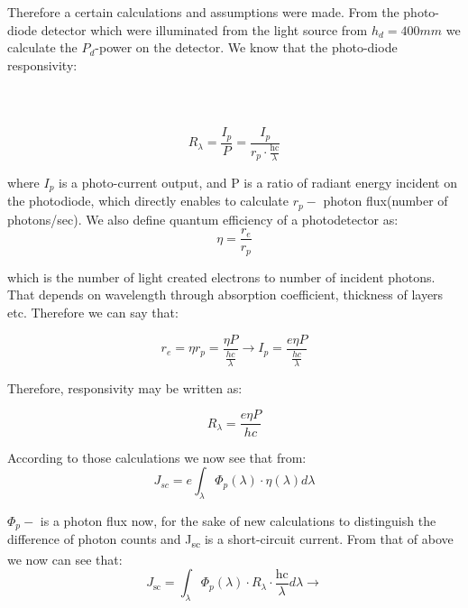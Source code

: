 Therefore a certain calculations and assumptions were made. From the
photo-diode detector which were illuminated from the light source from
\(h_{d} = 400mm\) we calculate the \(P_{d}\)-power on the detector. We know that the photo-diode responsivity: \\ \\ \\ \\ 

\begin{equation}
R_{\lambda} = \frac{I_{p}}{P} = \frac{I_{p}}{r_{p} \cdot \frac{\text{hc}}{\lambda}}
\end{equation}

where \(I_{p}\) is a photo-current output, and P is a ratio of radiant
energy incident on the photodiode, which directly enables to calculate
\(r_{p} -\) photon flux(number of photons/sec). We also define quantum
efficiency of a photodetector as:
\begin{equation}
\eta = \frac{r_{e}}{r_{p}}
\end{equation}


\noindent which is the number of light created electrons to number of incident
photons. That depends on wavelength through absorption coefficient,
thickness of layers etc. Therefore we can say that:

\begin{equation}
r_{e} = \eta r_{p} = \frac{\eta P}{\frac{hc}{\lambda}} \rightarrow I_{p} = \frac{e\eta P}{\frac{hc}{\lambda}}
\end{equation}


 Therefore, responsivity may be written as:

\begin{equation}
R_{\lambda} = \frac{e\eta P}{hc}
\end{equation}


 According to those calculations we now see that from:
\begin{equation}
J_{sc} = e\int_{\lambda}^{}{\Phi_{p}(\lambda ) \cdot \eta (\lambda) d \lambda }
\end{equation}

 \(\Phi_{p} -\) is a photon flux now, for the sake of new calculations to
distinguish the difference of photon counts and J­\textsubscript{sc} is
a short-circuit current. From that of above we now can see that:
\begin{equation}
J_{\text{sc}} = \int_{\lambda}^{}{\Phi_{p}\left( \lambda \right) \cdot R_{\lambda } \cdot \frac{\text{hc}}{\lambda }d\lambda } \rightarrow
\end{equation}

